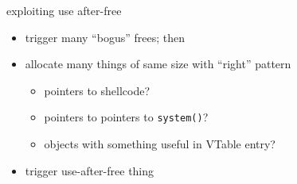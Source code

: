 
\begin{frame}{exploiting use after-free}
\begin{itemize}
\item trigger many ``bogus'' frees; then
\item allocate many things of same size with ``right'' pattern  
    \begin{itemize}
    \item pointers to shellcode?
    \item pointers to pointers to {\tt system()}?
    \item objects with something useful in VTable entry?
    \end{itemize}
\item trigger use-after-free thing
\end{itemize}
\end{frame}

